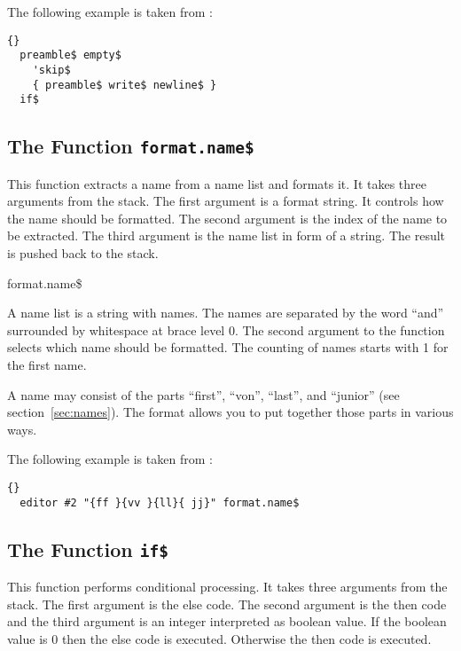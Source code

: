 The following example is taken from :

\begin{lstlisting}{}
  preamble$ empty$
    'skip$
    { preamble$ write$ newline$ }
  if$
\end{lstlisting}%


\subsection{The Function \texttt{format.name\$}}%

This function extracts a name from a name list and formats it. It
takes three arguments from the stack. The first argument is a format
string. It controls how the name should be formatted. The second
argument is the index of the name to be extracted. The third argument
is the name list in form of a string. The result is pushed back to the
stack.

\begin{BstFunction}{format.name\$}
\end{BstFunction}

A name list is a string with names. The names are separated by the
word ``and'' surrounded by whitespace at brace level 0. The second
argument to the function selects which name should be formatted. The
counting of names starts with 1 for the first name.

A name may consist of the parts ``first'', ``von'', ``last'', and
``junior'' (see section~\ref{sec:names}). The format allows you to put
together those parts in various ways.


\INCOMPLETE

The following example is taken from :

\begin{lstlisting}{}
  editor #2 "{ff }{vv }{ll}{ jj}" format.name$
\end{lstlisting}


\subsection{The Function \texttt{if\$}}%

This function performs conditional processing. It takes three
arguments from the stack. The first argument is the else code. The
second argument is the then code and the third argument is an integer
interpreted as boolean value. If the boolean value is 0 then the else
code is executed. Otherwise the then code is executed.

